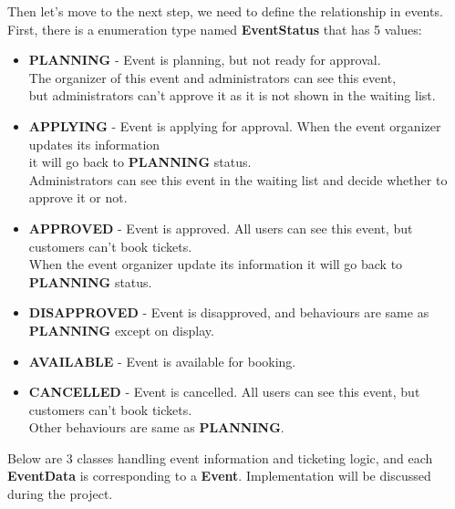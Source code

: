 \documentclass{article}
\begin{document}
\pagebreak
Then let's move to the next step, we need to define the relationship in events. 
First, there is a enumeration type named \textbf{EventStatus} that has 5 values: 
\begin{itemize}
    \item \textbf{PLANNING} - Event is planning, but not ready for approval.\\The organizer of this event and administrators can see this event,\\but administrators can't approve it as it is not shown in the waiting list.
    \item \textbf{APPLYING} - Event is applying for approval. When the event organizer updates its information\\it will  go back to \textbf{PLANNING} status.\\Administrators can see this event in the waiting list and decide whether to approve it or not.
    \item \textbf{APPROVED} - Event is approved. All users can see this event, but customers can't book tickets.\\When the event organizer update its information it will go back to \textbf{PLANNING} status.
    \item \textbf{DISAPPROVED} - Event is disapproved, and behaviours are same as \textbf{PLANNING} except on display.
    \item \textbf{AVAILABLE} - Event is available for booking.
    \item \textbf{CANCELLED} - Event is cancelled. All users can see this event, but customers can't book tickets.\\ Other behaviours are same as \textbf{PLANNING}.
\end{itemize}
 
Below are 3 classes handling event information and ticketing logic, and each \textbf{EventData} is corresponding to a \textbf{Event}.
Implementation will be discussed during the project.
\end{document}
